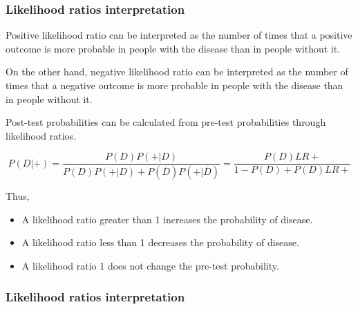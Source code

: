 \begin{frame}
\frametitle{Likelihood ratios interpretation}
Positive likelihood ratio can be interpreted as the number of times that a positive outcome is more probable in people
with the disease than in people without it. 

On the other hand, negative likelihood ratio can be interpreted as the number of times that a negative outcome is more
probable in people with the disease than in people without it. 

Post-test probabilities can be calculated from pre-test probabilities through likelihood ratios.

\[
P(D|+) = \frac{P(D)P(+|D)}{P(D)P(+|D)+P(\overline{D})P(+|\overline{D})} = \frac{P(D)LR+}{1-P(D)+P(D)LR+}
\]

Thus, 
\begin{itemize}
\item A likelihood ratio greater than 1 increases the probability of disease.
\item A likelihood ratio less than 1 decreases the probability of disease.
\item A likelihood ratio 1 does not change the pre-test probability. 
\end{itemize}
\end{frame}


\begin{frame}
\frametitle{Likelihood ratios interpretation}
\begin{center}
\end{center}
\end{frame}
